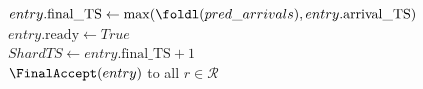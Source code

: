 \begin{algorithm}[!tb]
{        $entry.\mathrm{final\_TS} \gets \max(\foldl(pred\_arrivals), entry.\mathrm{arrival\_TS})$\\
        $entry.\mathrm{ready} \gets True$\\
        $ShardTS \gets entry.\mathrm{final\_TS} + 1$\\
        \Send $\FinalAccept(entry)$ to all $r \in \mathcal{R}$\\
    }
    \caption{Ellis\_CT Leader}
    \label{ellis-ct-leaderprotocol}
\end{algorithm}

